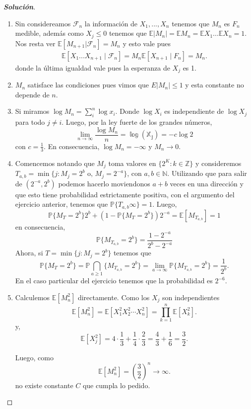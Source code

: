 \documentclass[11pt]{article}
\theoremstyle{ejstyle}
\newenvironment{solucion}
{\begin{proof}[{\bfseries\color{deepindigo} Solución}]}
	{\end{proof}}
\begin{document}
	\begin{solucion} \, 
		
		\begin{enumerate}
			\item Sin considereamos $\mathcal{F}_n$ la información de $X_1, ..., X_n$ tenemos que $M_n$ es $F_n$ medible, además como $X_j \leq 0$ tenemos que $\mathbb{E}|M_n| = \mathbb{E}M_n = \mathbb{E}X_1...\mathbb{E}X_n = 1$. Nos resta ver $\mathbb{E}[M_{n+1}|\mathcal{F}_n] = M_n$ y esto vale pues
			\[
			\begin{aligned}
				\mathbb{E}[X_1...X_{n+1} \mid \mathcal{F}_n] = M_n \mathbb{E}[X_{n+1} \mid F_n] = M_n.
			\end{aligned}
			\]
			donde la última igualdad vale pues la esperanza de $X_j$ es 1.
			
			\item $M_n$ satisface las condiciones pues vimos que $E|M_n| \leq 1$ y esta constante no depende de $n$.
			
			\item Si miramos $\log{M_n} = \sum_i^{n} \log{x_i}$. Donde $\log{X_i}$ es independiente de $\log{X_j}$ para todo $j \neq i$. Luego, por la ley fuerte de los grandes números,
			$$
			\lim_{n \to \infty} \frac{\log{M_n}}{n} = \mathbb{\log(X_j)} = - c \log{2} 
			$$
			con $c = \frac{1}{3}.$ En consecuencia, $\log{M_n} = -\infty$ y $M_n \to 0.$
			
			\item Comencemos notando que $M_j$ toma valores en $\{2^{K} : k \in \mathbb{Z}\}$ y consideremos $T_{a, b} = \min \{j : M_j = 2^{b} \text{ o, } M_j = 2^{-a}\}$, con $a, b \in \mathbb{N}.$ Utilizando que para salir de $(2^{-a}, 2^{b})$ podemos hacerlo moviendonos $a+b$ veces en una dirección y que esto tiene probabilidad estrictamente positiva, con el argumento del ejercicio anterior, tenemos que $\mathbb{P}\{T_{a, b} \infty \} = 1$. Luego,
			$$
			\mathbb{P}\{M_T = 2^{b}\} 2^{b} + (1 - \mathbb{P}\{M_T = 2^{b}\}) 2^{-a} = \mathbb{E}[M_{T_{a,b}}] = 1
			$$
			en consecuencia,
			$$
			\mathbb{P}\{M_{T_{a, b}} = 2^{b}\} =\frac{ 1 - 2^{-a}}{2^b - 2^{-a}}
			$$
			Ahora, si $T = \min \{ j : M_j = 2^{b} \}$ tenemos que
			$$
			\mathbb{P}\{M_{T} = 2^{b}\} = \mathbb{P} \bigcap_{a \geq 1} \{M_{T_{a, b}} = 2^{b}\} = \lim_{a \to \infty} \mathbb{P}\{M_{T_{a, b}} = 2^{b}\} =\frac{1}{2^b}.
			$$
			En el caso particular del ejercicio tenemos que la probabilidad es $2^{-6}.$
			
			\item Calculemos $\mathbb{E}[M_n^2]$ directamente. Como los $X_j$ son independientes
			$$\mathbb{E}[M_n^2] = \mathbb{E}[X_1^2 X_2^2 \cdots X_n^2] = \prod_{k=1}^n \mathbb{E}[X_k^2].$$
			y,
			$$\mathbb{E}[X_j^2] = 4 \cdot \frac{1}{3} + \frac{1}{4} \cdot \frac{2}{3} = \frac{4}{3} + \frac{1}{6} = \frac{3}{2}.$$
			
			\newpage
			
			Luego, como
			$$\mathbb{E}[M_n^2] = \left(\frac{3}{2}\right)^n \to \infty.$$
			no existe constante $C$ que cumpla lo pedido.
			
		\end{enumerate} 
		
	\end{solucion}
	
\end{document}
